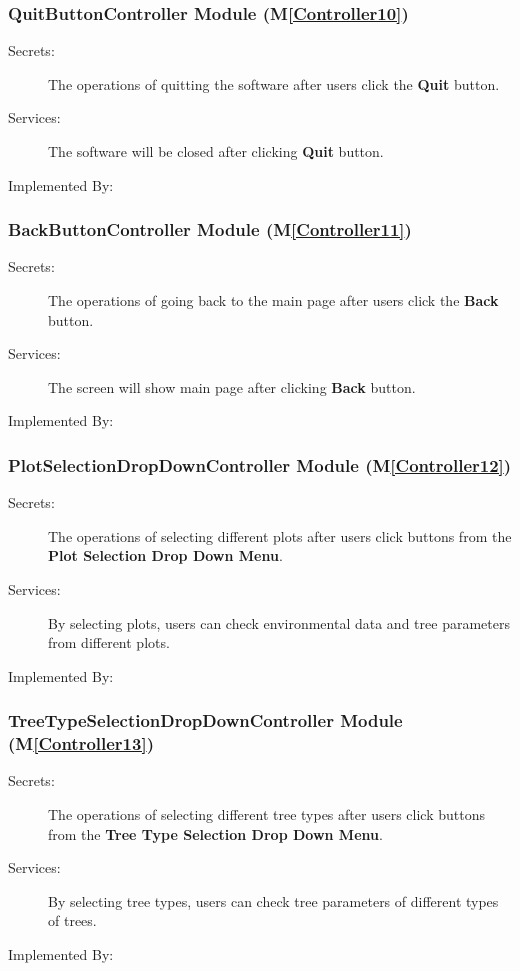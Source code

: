 \documentclass[12pt, titlepage]{article}
\newcommand{\mref}[1]{M\ref{#1}}
\begin{document}
\renewcommand{\bt}{\textbf{Quit }}
\subsubsection{QuitButtonController Module (\mref{Controller10})}
\begin{description}
\item[Secrets:] The operations of quitting the software after users click the \bt button.
\item[Services:] The software will be closed after clicking \bt button.
\item[Implemented By:] \progname{}
\end{description}

\renewcommand{\bt}{\textbf{Back }}
\subsubsection{BackButtonController Module (\mref{Controller11})}
\begin{description}
\item[Secrets:] The operations of going back to the main page after users click the \bt
 button.
\item[Services:] The screen will show main page after clicking \bt button.
\item[Implemented By:] \progname{}
\end{description}

\renewcommand{\bt}{\textbf{Plot Selection Drop Down Menu}}
\subsubsection{PlotSelectionDropDownController Module (\mref{Controller12})}
\begin{description}
\item[Secrets:] The operations of selecting different plots after users click buttons 
from the \bt.
\item[Services:] By selecting plots, users can check environmental data and tree parameters
from different plots.
\item[Implemented By:] \progname{}
\end{description}

\renewcommand{\bt}{\textbf{Tree Type Selection Drop Down Menu}}
\subsubsection{TreeTypeSelectionDropDownController Module (\mref{Controller13})}
\begin{description}
\item[Secrets:] The operations of selecting different tree types after users click buttons 
from the \bt.
\item[Services:] By selecting tree types, users can check tree parameters of different 
types of trees.
\item[Implemented By:] \progname{}
\end{description}
\end{document}
